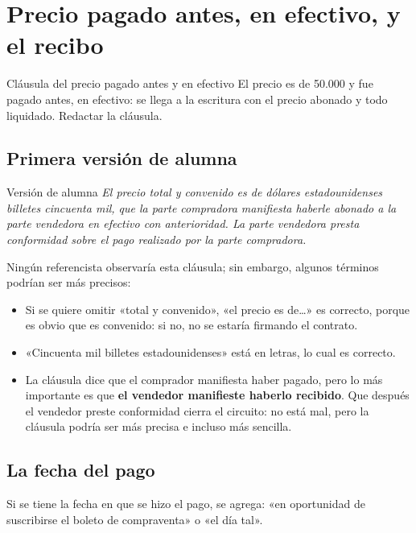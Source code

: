 \documentclass[12pt,oneside]{book}
\begin{document}
\section{Precio pagado antes, en efectivo, y el recibo}

\begin{exercise}{Cláusula del precio pagado antes y en efectivo}
El precio es de 50.000 y fue pagado antes, en efectivo: se llega a la escritura con el precio abonado y todo liquidado. Redactar la cláusula.
\end{exercise}

\subsection{Primera versión de alumna}

\begin{example}{Versión de alumna}
\textit{El precio total y convenido es de dólares estadounidenses billetes cincuenta mil, que la parte compradora manifiesta haberle abonado a la parte vendedora en efectivo con anterioridad. La parte vendedora presta conformidad sobre el pago realizado por la parte compradora.}
\end{example}

Ningún referencista observaría esta cláusula; sin embargo, algunos términos podrían ser más precisos:

\begin{itemize}
    \item Si se quiere omitir «total y convenido», «el precio es de\ldots» es correcto, porque es obvio que es convenido: si no, no se estaría firmando el contrato.
    \item «Cincuenta mil billetes estadounidenses» está en letras, lo cual es correcto.
    \item La cláusula dice que el comprador manifiesta haber pagado, pero lo más importante es que \textbf{el vendedor manifieste haberlo recibido}. Que después el vendedor preste conformidad cierra el circuito: no está mal, pero la cláusula podría ser más precisa e incluso más sencilla.
\end{itemize}

\subsection{La fecha del pago}

Si se tiene la fecha en que se hizo el pago, se agrega: «en oportunidad de suscribirse el boleto de compraventa» o «el día tal».
\end{document}
